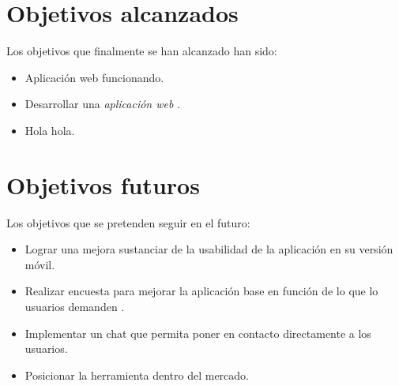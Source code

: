 \section{Objetivos alcanzados}\label{objetivos-alcanzados}
Los objetivos que finalmente se han alcanzado han sido: 
\begin{itemize}
\tightlist
\item
  Aplicación web funcionando. 
\item
  Desarrollar una \emph{aplicación web} . 
\item
  Hola hola.
\end{itemize}

\section{Objetivos futuros}\label{objetivos-futuros}
Los objetivos que se pretenden seguir en el futuro: 
\begin{itemize}
\tightlist
\item
  Lograr una mejora sustanciar de la usabilidad de la aplicación en su versión móvil. 
\item
  Realizar encuesta para mejorar la aplicación base en función de lo que lo usuarios demanden . 
\item
  Implementar un chat que permita poner en contacto directamente a los usuarios.
\item
  Posicionar la herramienta dentro del mercado.
\end{itemize}